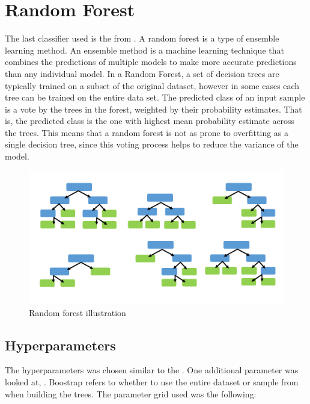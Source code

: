 \section{Random Forest}
The last classifier used is the  from .
A random forest is a type of ensemble learning method.
An ensemble method is a machine learning technique that combines the predictions of multiple models to make more accurate predictions than any individual model.
In a Random Forest, a set of decision trees are typically trained on a subset of the original dataset, however in some cases each tree can be trained on the entire data set.
The predicted class of an input sample is a vote by the trees in the forest, weighted by their probability estimates.
That is, the predicted class is the one with highest mean probability estimate across the trees.
This means that a random forest is not as prone to overfitting as a single decision tree, since this voting process helps to reduce the variance of the model.

\begin{figure}[H]
    \centering
    \includegraphics[scale=0.3]{figures_for_report/random_forest_simple_example}
    \captionsetup{justification=centering,margin=2cm}
    \caption{Random forest illustration}\label{fig:figure}
\end{figure}


\subsection{Hyperparameters}\label{subsec:hyperparameters}
The hyperparameters was chosen similar to the .
One additional parameter was looked at, .
Boostrap refers to whether to use the entire dataset or sample from when building the trees.
The parameter grid used was the following:\\

